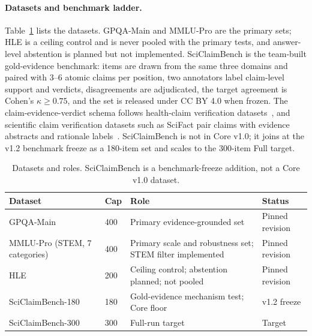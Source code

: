 \paragraph*{Datasets and benchmark ladder.}
Table~\ref{tab:datasets} lists the datasets. GPQA-Main and MMLU-Pro are the primary sets; HLE is a ceiling control and is never pooled with the primary tests, and answer-level abstention is planned but not implemented. SciClaimBench is the team-built gold-evidence benchmark: items are drawn from the same three domains and paired with 3--6 atomic claims per position, two annotators label claim-level support and verdicts, disagreements are adjudicated, the target agreement is Cohen's $\kappa \ge 0.75$, and the set is released under CC BY 4.0 when frozen. The claim-evidence-verdict schema follows health-claim verification datasets~\cite{sarrouti2021healthver}, and scientific claim verification datasets such as SciFact pair claims with evidence abstracts and rationale labels~\cite{wadden2020fact}. SciClaimBench is not in Core v1.0; it joins at the v1.2 benchmark freeze as a 180-item set and scales to the 300-item Full target.

\begin{table}[H]
  \centering
  \caption{Datasets and roles. SciClaimBench is a benchmark-freeze addition, not a Core v1.0 dataset.}
  \renewcommand{\arraystretch}{1.25}
  \small
  \begin{tabular}{|p{}|p{}|p{}|p{}|}
    \hline
    Dataset & Cap & Role & Status \\
    \hline
    GPQA-Main & 400 & Primary evidence-grounded set & Pinned revision \\
    \hline
    MMLU-Pro (STEM, 7 categories) & 400 & Primary scale and robustness set; STEM filter implemented & Pinned revision \\
    \hline
    HLE & 200 & Ceiling control; abstention planned; not pooled & Pinned revision \\
    \hline
    SciClaimBench-180 & 180 & Gold-evidence mechanism test; Core floor & v1.2 freeze \\
    \hline
    SciClaimBench-300 & 300 & Full-run target & Target \\
    \hline
  \end{tabular}
  \label{tab:datasets}
\end{table}

